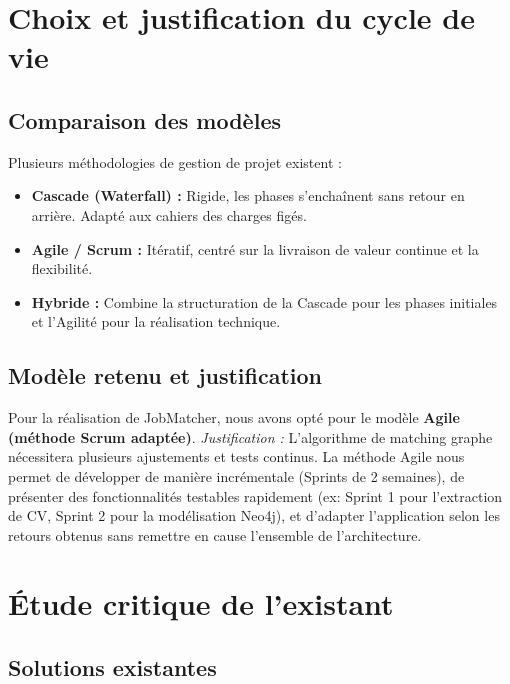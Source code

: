 \documentclass[12pt,a4paper]{report}
\begin{document}
\section{Choix et justification du cycle de vie}

\subsection{Comparaison des modèles}
Plusieurs méthodologies de gestion de projet existent :
\begin{itemize}
    \item \textbf{Cascade (Waterfall) :} Rigide, les phases s'enchaînent sans retour en arrière. Adapté aux cahiers des charges figés.
    \item \textbf{Agile / Scrum :} Itératif, centré sur la livraison de valeur continue et la flexibilité.
    \item \textbf{Hybride :} Combine la structuration de la Cascade pour les phases initiales et l'Agilité pour la réalisation technique.
\end{itemize}

\subsection{Modèle retenu et justification}
Pour la réalisation de JobMatcher, nous avons opté pour le modèle \textbf{Agile (méthode Scrum adaptée)}. 
\textit{Justification :} L'algorithme de matching graphe nécessitera plusieurs ajustements et tests continus. La méthode Agile nous permet de développer de manière incrémentale (Sprints de 2 semaines), de présenter des fonctionnalités testables rapidement (ex: Sprint 1 pour l'extraction de CV, Sprint 2 pour la modélisation Neo4j), et d'adapter l'application selon les retours obtenus sans remettre en cause l'ensemble de l'architecture.

\section{Étude critique de l'existant}

\subsection{Solutions existantes}
\end{document}
